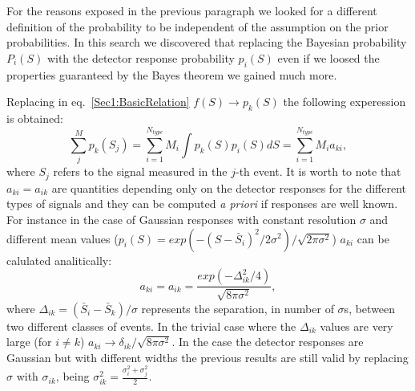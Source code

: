 For the reasons exposed in the previous paragraph we looked for a different definition of the probability to be independent of the assumption on the prior probabilities. In this search we discovered that replacing the Bayesian probability $P_{i}(S)$ with the detector response probability $p_{i}(S)$ even if we loosed the properties guaranteed by the Bayes theorem we gained much more.

Replacing in eq.~\ref{Sec1:BasicRelation} $f(S) \rightarrow p_{k}(S)$ the
following experession is obtained:
\begin{equation}
\label{Sec1:QSmain}
\sum\limits_{j}^{M}p_{k}(S_j) = \sum\limits_{i=1}^{N_{type}}M_{i}\int p_{k}(S)
p_{i}(S) dS = \sum\limits_{i=1}^{N_{type}}M_{i} a_{ki}, 
\end{equation}
where $S_j$ refers to the signal
measured in the $j$-th event.
It is worth to note that $a_{ki}=a_{ik}$ are quantities depending only on the detector responses
for the different types of signals and they can be computed {\it a priori} if responses are well known.
For instance in the case of Gaussian responses with constant resolution
$\sigma$ and different mean values ($p_{i}(S) =
exp(-(S-\bar{S}_{i})^{2}/2\sigma^{2})/\sqrt{2\pi\sigma^{2}}$) $a_{ki}$ can
be calulated analitically:
\begin{equation}
\label{Sec1:GaussianMatrixElements}
a_{ki} = a_{ik} = \frac{exp(-\Delta_{ik}^{2}/4)}{\sqrt{8\pi\sigma^2}},
\end{equation}
where $\Delta_{ik}=(\bar{S}_{i} - \bar{S}_{k})/\sigma$ represents the
separation, in number of $\sigma$s, between two different classes of events.
In the trivial case where the $\Delta_{ik}$ values are very large (for $i \neq
k$) $a_{ki} \rightarrow \delta_{ik} / \sqrt{8\pi\sigma^2}$.
In the case the detector responses are Gaussian but with different
widths the previous results are still valid by replacing $\sigma$ with
$\sigma_{ik}$,  being $\sigma_{ik}^2 = \frac{\sigma_{i}^2 + \sigma_{j}^2}{2}$.

